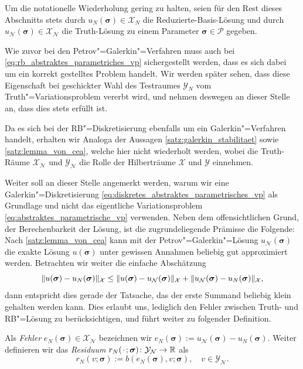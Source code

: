 \documentclass[../main.tex]{subfiles}
\begin{document}
Um die notationelle Wiederholung gering zu halten, seien für den Rest dieses Abschnitts stets durch $u_{N}(\bm \sigma) \in \mathcal X_{N}$ die Reduzierte-Basis-Lösung und durch $u_{\mathcal N}(\bm \sigma) \in \mathcal X_{\mathcal N}$ die Truth-Lösung zu einem Parameter $\bm \sigma \in \mathcal P$ gegeben.

Wie zuvor bei den Petrov"=Galerkin"=Verfahren muss auch bei \cref{eq:rb_abstraktes_parametriches_vp} sichergestellt werden, dass es sich dabei um ein korrekt gestelltes Problem handelt.
Wir werden später sehen, dass diese Eigenschaft bei geschickter Wahl des Testraumes $\mathcal Y_{N}$ vom Truth"=Variationsproblem vererbt wird, und nehmen deswegen an dieser Stelle an, dass dies stets erfüllt ist.

Da es sich bei der RB"=Diskretisierung ebenfalls um ein Galerkin"=Verfahren handelt, erhalten wir Analoga der Aussagen \cref{satz:galerkin_stabilitaet} sowie \cref{satz:lemma_von_cea}, welche hier nicht wiederholt werden, wobei die Truth-Räume $\mathcal X_{\mathcal N}$ und $\mathcal Y_{\mathcal N}$ die Rolle der Hilberträume $\mathcal X$ und $\mathcal Y$ einnehmen.

Weiter soll an dieser Stelle angemerkt werden, warum wir eine Galerkin"=Diskretisierung \cref{eq:diskretes_abstraktes_parametrisches_vp} als Grundlage und nicht das eigentliche Variationsproblem \cref{eq:abstraktes_parametrische_vp} verwenden.
Neben dem offensichtlichen Grund, der Berechenbarkeit der Lösung, ist die zugrundeliegende Prämisse die Folgende:
Nach \cref{satz:lemma_von_cea} kann mit der Petrov"=Galerkin"=Lösung $u_{\mathcal N}(\bm \sigma)$ die exakte Lösung $u(\bm \sigma)$ unter gewissen Annahmen beliebig gut approximiert werden.
Betrachten wir weiter die einfache Abschätzung
\begin{equation}
    \lVert u(\bm \sigma) - u_{N}(\bm \sigma)\rVert_{\mathcal X} \leq \lVert u(\bm \sigma) - u_{\mathcal N}(\bm \sigma)\rVert_{\mathcal X} + \lVert u_{\mathcal N}(\bm \sigma) - u_{N}(\bm \sigma)\rVert_{\mathcal X},
\end{equation}
dann entspricht dies gerade der Tatsache, das der erste Summand beliebig klein gehalten werden kann.
Dies erlaubt uns, lediglich den Fehler zwischen Truth- und RB"=Lösung zu berücksichtigen, und führt weiter zu folgender Definition.

\begin{Definition}\label{definition:rbm_fehler_und_residuum}
    Als \emph{Fehler} $e_{N}(\bm \sigma) \in \mathcal X_{\mathcal N}$ bezeichnen wir $e_{N}(\bm \sigma) := u_{\mathcal N}(\bm \sigma) - u_{N}(\bm \sigma)$.
    Weiter definieren wir das \emph{Residuum} $r_{N}({\mkern2mu\cdot\mkern2mu}; \bm \sigma) \colon \mathcal Y_{\mathcal N} \to \mathbb{R}$ als
    \begin{equation}\label{eq:variationsproblem_residuum}
        r_{N}(v; \bm \sigma) := b(e_{N}(\bm \sigma), v; \bm \sigma), \quad v \in \mathcal Y_{\mathcal N}.
    \end{equation}
\end{Definition}
\end{document}

